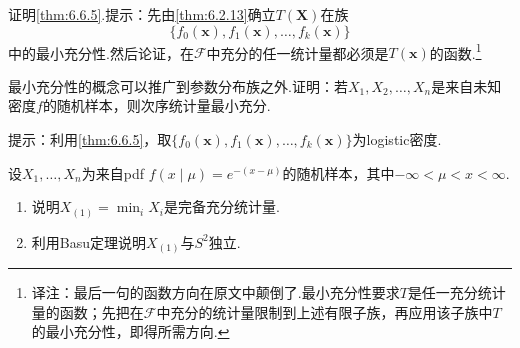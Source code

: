 \begin{exercise}\label{exercise:6.28}
证明\autoref{thm:6.6.5}.提示：先由\autoref{thm:6.2.13}确立$T(\boldsymbol X)$在族
$$\{f_0(\boldsymbol x),f_1(\boldsymbol x),\ldots,f_k(\boldsymbol x)\}$$
中的最小充分性.然后论证，在$\mathcal F$中充分的任一统计量都必须是$T(\boldsymbol x)$的函数.\footnote{译注：最后一句的函数方向在原文中颠倒了.最小充分性要求$T$是任一充分统计量的函数；先把在$\mathcal F$中充分的统计量限制到上述有限子族，再应用该子族中$T$的最小充分性，即得所需方向.}
\end{exercise}
\begin{exercise}\label{exercise:6.29}
最小充分性的概念可以推广到参数分布族之外.证明：若$X_1,X_2,\ldots,X_n$是来自未知密度$f$的随机样本，则次序统计量最小充分.

提示：利用\autoref{thm:6.6.5}，取$\{f_0(\boldsymbol x),f_1(\boldsymbol x),\ldots,f_k(\boldsymbol x)\}$为logistic密度.
\end{exercise}
\begin{exercise}\label{exercise:6.30}
设$X_1,\ldots,X_n$为来自pdf $f(x\mid\mu)=e^{-(x-\mu)}$的随机样本，其中$-\infty<\mu<x<\infty$.
\begin{enumerate}[label=(\alph*)]
\item 说明$X_{(1)}=\min_iX_i$是完备充分统计量.
\item 利用Basu定理说明$X_{(1)}$与$S^2$独立.
\end{enumerate}
\end{exercise}
